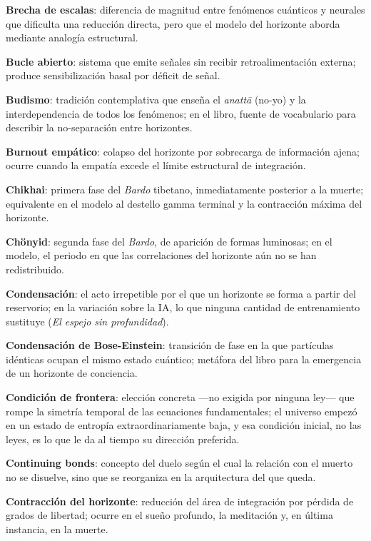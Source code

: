 \glos \textbf{Brecha de escalas}: diferencia de magnitud entre fenómenos cuánticos y neurales que dificulta una reducción directa, pero que el modelo del horizonte aborda mediante analogía estructural.

\glos \textbf{Bucle abierto}: sistema que emite señales sin recibir retroalimentación externa; produce sensibilización basal por déficit de señal.

\glos \textbf{Budismo}: tradición contemplativa que enseña el \emph{anattā} (no-yo) y la interdependencia de todos los fenómenos; en el libro, fuente de vocabulario para describir la no-separación entre horizontes.

\glos \textbf{Burnout empático}: colapso del horizonte por sobrecarga de información ajena; ocurre cuando la empatía excede el límite estructural de integración.

\glos \textbf{Chikhai}: primera fase del \emph{Bardo} tibetano, inmediatamente posterior a la muerte; equivalente en el modelo al destello gamma terminal y la contracción máxima del horizonte.

\glos \textbf{Chönyid}: segunda fase del \emph{Bardo}, de aparición de formas luminosas; en el modelo, el periodo en que las correlaciones del horizonte aún no se han redistribuido.

\glos \textbf{Condensación}: el acto irrepetible por el que un horizonte se forma a partir del reservorio; en la variación sobre la IA, lo que ninguna cantidad de entrenamiento sustituye (\emph{El espejo sin profundidad}).

\glos \textbf{Condensación de Bose-Einstein}: transición de fase en la que partículas idénticas ocupan el mismo estado cuántico; metáfora del libro para la emergencia de un horizonte de conciencia.

\glos \textbf{Condición de frontera}: elección concreta —no exigida por ninguna ley— que rompe la simetría temporal de las ecuaciones fundamentales; el universo empezó en un estado de entropía extraordinariamente baja, y esa condición inicial, no las leyes, es lo que le da al tiempo su dirección preferida.

\glos \textbf{Continuing bonds}: concepto del duelo según el cual la relación con el muerto no se disuelve, sino que se reorganiza en la arquitectura del que queda.

\glos \textbf{Contracción del horizonte}: reducción del área de integración por pérdida de grados de libertad; ocurre en el sueño profundo, la meditación y, en última instancia, en la muerte.

